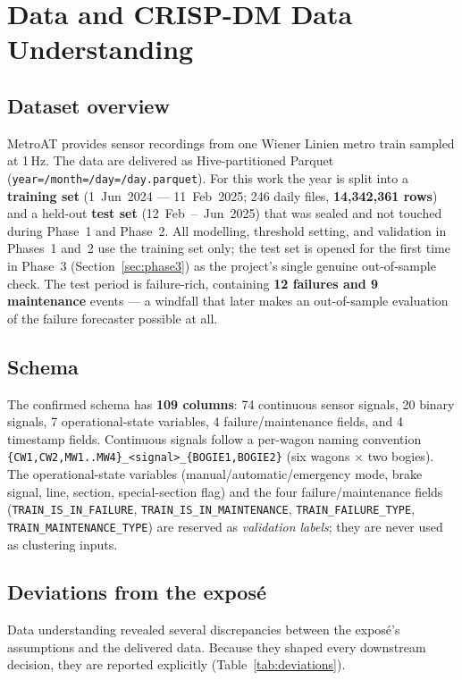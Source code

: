 \documentclass[11pt,a4paper]{article}
\begin{document}
\setcounter{section}{2}
\section{Data and CRISP-DM Data Understanding}
\label{sec:data}

\subsection{Dataset overview}
MetroAT provides sensor recordings from one Wiener Linien metro train sampled at 1\,Hz.
The data are delivered as Hive-partitioned Parquet (\texttt{year=/month=/day=/day.parquet}).
For this work the year is split into a \textbf{training set} (1~Jun~2024 --- 11~Feb~2025;
246 daily files, \textbf{14{,}342{,}361 rows}) and a held-out \textbf{test set}
(12~Feb~--~Jun~2025) that was sealed and not touched during Phase~1 and Phase~2. All
modelling, threshold setting, and validation in Phases~1 and~2 use the training set
only; the test set is opened for the first time in Phase~3 (Section~\ref{sec:phase3}) as
the project's single genuine out-of-sample check. The test period is failure-rich,
containing \textbf{12 failures and 9 maintenance} events --- a windfall that later makes
an out-of-sample evaluation of the failure forecaster possible at all.

\subsection{Schema}
The confirmed schema has \textbf{109 columns}: 74 continuous sensor signals, 20 binary
signals, 7 operational-state variables, 4 failure/maintenance fields, and 4 timestamp
fields. Continuous signals follow a per-wagon naming convention
\texttt{\{CW1,CW2,MW1..MW4\}\_<signal>\_\{BOGIE1,BOGIE2\}} (six wagons $\times$ two
bogies). The operational-state variables (manual/automatic/emergency mode, brake signal,
line, section, special-section flag) and the four failure/maintenance fields
(\texttt{TRAIN\_IS\_IN\_FAILURE}, \texttt{TRAIN\_IS\_IN\_MAINTENANCE},
\texttt{TRAIN\_FAILURE\_TYPE}, \texttt{TRAIN\_MAINTENANCE\_TYPE}) are reserved as
\emph{validation labels}; they are never used as clustering inputs.

\subsection{Deviations from the exposé}
\label{sec:deviations}
Data understanding revealed several discrepancies between the exposé's assumptions and
the delivered data. Because they shaped every downstream decision, they are reported
explicitly (Table~\ref{tab:deviations}).
\end{document}
